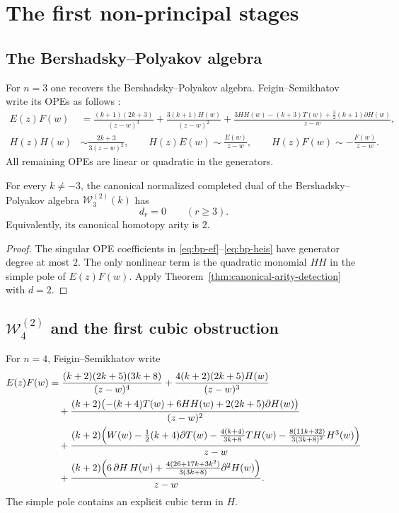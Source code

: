 \section{The first non-principal stages}

\subsection{The Bershadsky--Polyakov algebra}

For $n=3$ one recovers the Bershadsky--Polyakov algebra.  Feigin--Semikhatov
write its OPEs as follows \cite[(A.3)]{FeiginSemikhatov}:
\begin{align}
E(z)F(w)
&=
\frac{(k+1)(2k+3)}{(z-w)^3}
+
\frac{3(k+1)H(w)}{(z-w)^2}
+
\frac{3HH(w)-(k+3)T(w)+\frac32(k+1)\partial H(w)}{z-w},
\label{eq:bp-ef}
\\[4pt]
H(z)H(w)
&\sim \frac{2k+3}{3(z-w)^2},
\qquad
H(z)E(w)\sim \frac{E(w)}{z-w},
\qquad
H(z)F(w)\sim -\frac{F(w)}{z-w}.
\label{eq:bp-heis}
\end{align}
All remaining OPEs are linear or quadratic in the generators.

\begin{theorem}
\label{thm:bp-strict}
For every $k\neq -3$, the canonical normalized completed dual of the
Bershadsky--Polyakov algebra $\mathcal W_3^{(2)}(k)$ has
\[
d_r=0 \qquad (r\geq 3).
\]
Equivalently, its canonical homotopy arity is $2$.
\end{theorem}

\begin{proof}
The singular OPE coefficients in
\eqref{eq:bp-ef}--\eqref{eq:bp-heis} have generator degree at most $2$.
The only nonlinear term is the quadratic monomial $HH$ in the simple pole of
$E(z)F(w)$.  Apply Theorem~\ref{thm:canonical-arity-detection} with $d=2$.
\end{proof}

\subsection{\texorpdfstring{$\mathcal W_4^{(2)}$}{W4(2)} and the first cubic obstruction}

For $n=4$, Feigin--Semikhatov write
\cite[(A.4.2)]{FeiginSemikhatov}
\begin{align}
E(z)F(w)
&=
\frac{(k+2)(2k+5)(3k+8)}{(z-w)^4}
+
\frac{4(k+2)(2k+5)H(w)}{(z-w)^3}
\notag\\
&\quad
+\frac{(k+2)\bigl(-(k+4)T(w)+6HH(w)+2(2k+5)\partial H(w)\bigr)}{(z-w)^2}
\notag\\
&\quad
+\frac{(k+2)\Bigl(
W(w)-\frac12(k+4)\partial T(w)
-\frac{4(k+4)}{3k+8}T H(w)
-\frac{8(11k+32)}{3(3k+8)^2}H^3(w)
\Bigr)}{z-w}
\notag\\
&\quad
+\frac{(k+2)\Bigl(
6\,\partial H\,H(w)
+\frac{4(26+17k+3k^2)}{3(3k+8)}\partial^2 H(w)
\Bigr)}{z-w}.
\label{eq:w4-ef}
\end{align}
The simple pole contains an explicit cubic term in $H$.

